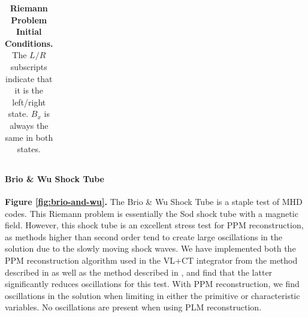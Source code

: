 \documentclass[modern, linenumbers]{aastex631}
\begin{document}
\begin{table}
\begin{tabular}{lcccccccc}
    
    
    \end{tabular}
    \caption{\textbf{Riemann Problem Initial Conditions.} The $L/R$ subscripts indicate that it is the left/right state. $B_x$ is always the same in both states.}
    \label{table:riemann}
\end{table}

\paragraph{Brio \& Wu Shock Tube}
\textbf{Figure \ref{fig:brio-and-wu}.}
The Brio \& Wu Shock Tube \citep{brio_wu_1988} is a staple test of MHD codes. This Riemann problem is essentially the Sod shock tube \citep{sod_1978} with a magnetic field. However, this shock tube is an excellent stress test for PPM reconstruction, as methods higher than second order tend to create large oscillations in the solution due to the slowly moving shock waves. We have implemented both the PPM reconstruction algorithm used in the VL+CT integrator from the method described in \cite{stone_athena_2008} as well as the method described in \cite{felker_2018}, and find that the latter significantly reduces oscillations for this test. With PPM reconstruction, we find  oscillations in the solution when limiting in either the primitive or characteristic variables. No oscillations are present when using PLM reconstruction.
\end{document}
